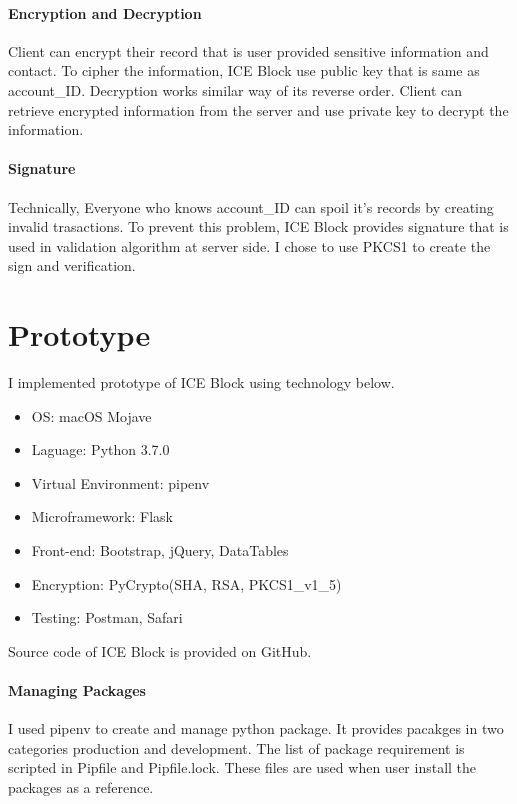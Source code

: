 \documentclass[conference]{IEEEtran}
\begin{document}
\paragraph{Encryption and Decryption}
Client can encrypt their record that is user provided sensitive information and contact.
To cipher the information, ICE Block use public key that is same as account\_ID.
Decryption works similar way of its reverse order. Client can retrieve encrypted information from the server and use private key to decrypt the information.


\paragraph{Signature}
Technically, Everyone who knows account\_ID can spoil it's records by creating invalid trasactions.
To prevent this problem, ICE Block provides signature that is used in validation algorithm at server side.
I chose to use PKCS1 to create the sign and verification.


\section{Prototype}
I implemented prototype of ICE Block using technology below.

\begin{itemize}
    \item OS: macOS Mojave
    \item Laguage: Python 3.7.0
    \item Virtual Environment: pipenv
    \item Microframework: Flask
    \item Front-end: Bootstrap, jQuery, DataTables
    \item Encryption: PyCrypto(SHA, RSA, PKCS1\_v1\_5)
    \item Testing: Postman, Safari
\end{itemize}

Source code of ICE Block is provided on GitHub.\cite{r3}

\paragraph{Managing Packages}
I used pipenv to create and manage python package.
It provides pacakges in two categories production and development.
The list of package requirement is scripted in Pipfile and Pipfile.lock.
These files are used when user install the packages as a reference.  
\end{document}

